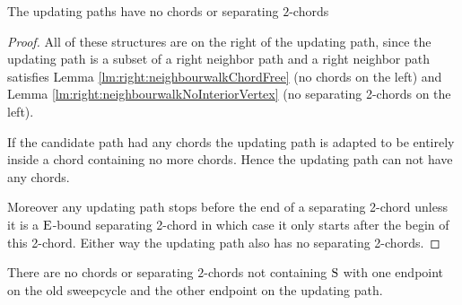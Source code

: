     \begin{lemma}
      The updating paths have no chords or separating $2$-chords
      \label{lm:sweep:augNoIregularity}
    \end{lemma}
    \begin{proof}
        All of these structures are on the right of the updating path, since the updating path is a subset of a right neighbor path and a right neighbor path satisfies Lemma \ref{lm:right:neighbourwalkChordFree} (no chords on the left) and Lemma \ref{lm:right:neighbourwalkNoInteriorVertex} (no separating 2-chords on the left).

        If the candidate path had any chords the updating path is adapted to be entirely inside a chord containing no more chords. Hence the updating path can not have any chords.

        Moreover any updating path stops before the end of a separating 2-chord unless it is a $\mathrm{E}$-bound separating 2-chord in which case it only starts after the begin of this 2-chord. Either way the updating path also has no separating 2-chords.
    \end{proof}

    \begin{lemma}
      \label{lm:sweep:noConnectingIregularity}
      There are no chords or separating $2$-chords not containing $\mathrm{S}$ with one endpoint on the old sweepcycle and the other endpoint on the updating path.
    \end{lemma}


